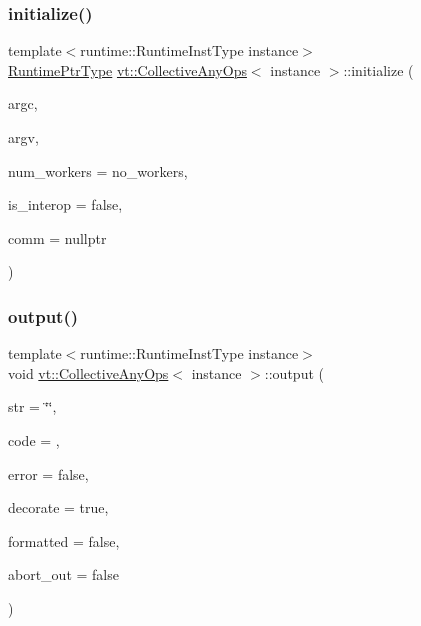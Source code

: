 \mbox{\label{structvt_1_1_collective_any_ops_afbf0247b03bc917bb8dbf56142eb698e}} 
\subsubsection{\texorpdfstring{initialize()}{initialize()}}
{\footnotesize\ttfamily template$<$runtime\+::\+Runtime\+Inst\+Type instance$>$ \\
\hyperlink{namespacevt_a0ce60e0299d8fa32223b3b9ffa0af466}{Runtime\+Ptr\+Type} \hyperlink{structvt_1_1_collective_any_ops}{vt\+::\+Collective\+Any\+Ops}$<$ instance $>$\+::initialize (\begin{DoxyParamCaption}\item[{int \&}]{argc,  }\item[{char $\ast$$\ast$\&}]{argv,  }\item[{\hyperlink{namespacevt_aa93398ea48f2cb6c188512250f7cc248}{Worker\+Count\+Type} const}]{num\+\_\+workers = {\ttfamily no\+\_\+workers},  }\item[{bool}]{is\+\_\+interop = {\ttfamily false},  }\item[{M\+P\+I\+\_\+\+Comm $\ast$}]{comm = {\ttfamily nullptr} }\end{DoxyParamCaption})\hspace{0.3cm}{\ttfamily [static]}}

\mbox{\label{structvt_1_1_collective_any_ops_a5ae4676659166ab1e1ac7334776d58c3}} 
\subsubsection{\texorpdfstring{output()}{output()}}
{\footnotesize\ttfamily template$<$runtime\+::\+Runtime\+Inst\+Type instance$>$ \\
void \hyperlink{structvt_1_1_collective_any_ops}{vt\+::\+Collective\+Any\+Ops}$<$ instance $>$\+::output (\begin{DoxyParamCaption}\item[{std\+::string const}]{str = {\ttfamily \char`\"{}\char`\"{}},  }\item[{\hyperlink{namespacevt_a793764d753923abc3d32929870beb485}{Error\+Code\+Type} const}]{code = {},  }\item[{bool}]{error = {\ttfamily false},  }\item[{bool}]{decorate = {\ttfamily true},  }\item[{bool}]{formatted = {\ttfamily false},  }\item[{bool}]{abort\+\_\+out = {\ttfamily false} }\end{DoxyParamCaption})\hspace{0.3cm}{\ttfamily [static]}}

